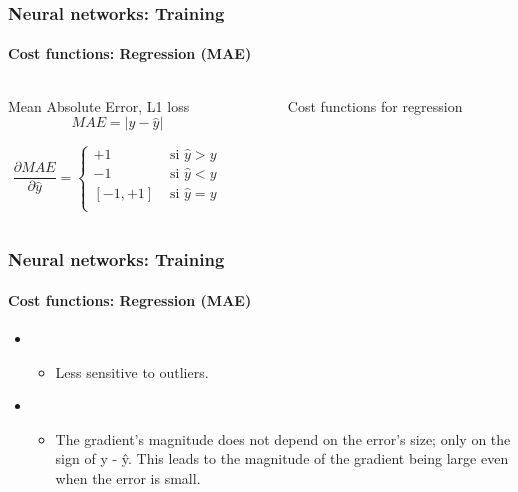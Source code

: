 \documentclass[xcolor=table]{beamer}
\begin{document}
\begin{frame}
	\frametitle{Neural networks: Training}
	\framesubtitle{Cost functions: Regression (MAE)}

\begin{columns}
	\begin{column}{.68\linewidth}
		\begin{block}{Mean Absolute Error, L1 loss}
			\[MAE = |y - \hat{y}|\]
			
			\[
			\frac{\partial MAE}{\partial \hat{y}} = 
			\begin{cases}
			+1 & \text{ si } \hat{y} > y \\
			-1 & \text{ si } \hat{y} < y \\
			[-1, +1] & \text{ si } \hat{y} = y \\
			\end{cases}
			\]
		\end{block}
	\end{column}%
	\begin{column}{.3\linewidth}
		\begin{figure}
			\caption{Cost functions for regression \cite{2017-rosenberg}}
		\end{figure}
	\end{column}
\end{columns}

\end{frame}

\begin{frame}
	\frametitle{Neural networks: Training}
	\framesubtitle{Cost functions: Regression (MAE)}

\begin{itemize}
	\item {}
	\begin{itemize}
		\item Less sensitive to outliers.
	\end{itemize}
	\item {}
	\begin{itemize}
		\item The gradient's magnitude does not depend on the error's size; only on the sign of y - ŷ. 
		This leads to the magnitude of the gradient being large even when the error is small.
	\end{itemize}
\end{itemize}

\end{frame}
\end{document}
